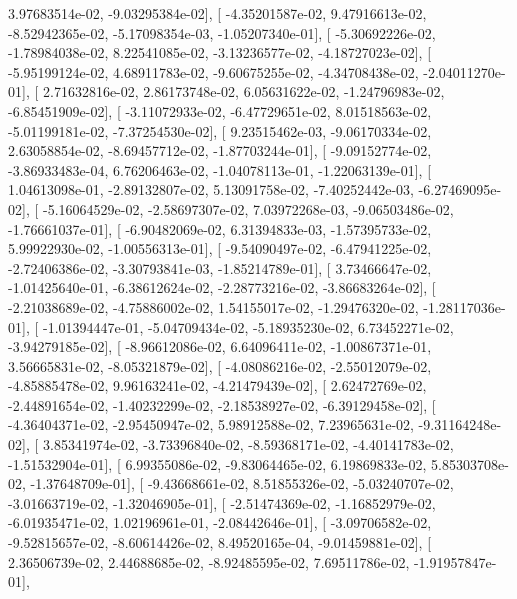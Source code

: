 \documentclass{article}
\begin{document}
          3.97683514e-02,  -9.03295384e-02],
       [ -4.35201587e-02,   9.47916613e-02,  -8.52942365e-02,
         -5.17098354e-03,  -1.05207340e-01],
       [ -5.30692226e-02,  -1.78984038e-02,   8.22541085e-02,
         -3.13236577e-02,  -4.18727023e-02],
       [ -5.95199124e-02,   4.68911783e-02,  -9.60675255e-02,
         -4.34708438e-02,  -2.04011270e-01],
       [  2.71632816e-02,   2.86173748e-02,   6.05631622e-02,
         -1.24796983e-02,  -6.85451909e-02],
       [ -3.11072933e-02,  -6.47729651e-02,   8.01518563e-02,
         -5.01199181e-02,  -7.37254530e-02],
       [  9.23515462e-03,  -9.06170334e-02,   2.63058854e-02,
         -8.69457712e-02,  -1.87703244e-01],
       [ -9.09152774e-02,  -3.86933483e-04,   6.76206463e-02,
         -1.04078113e-01,  -1.22063139e-01],
       [  1.04613098e-01,  -2.89132807e-02,   5.13091758e-02,
         -7.40252442e-03,  -6.27469095e-02],
       [ -5.16064529e-02,  -2.58697307e-02,   7.03972268e-03,
         -9.06503486e-02,  -1.76661037e-01],
       [ -6.90482069e-02,   6.31394833e-03,  -1.57395733e-02,
          5.99922930e-02,  -1.00556313e-01],
       [ -9.54090497e-02,  -6.47941225e-02,  -2.72406386e-02,
         -3.30793841e-03,  -1.85214789e-01],
       [  3.73466647e-02,  -1.01425640e-01,  -6.38612624e-02,
         -2.28773216e-02,  -3.86683264e-02],
       [ -2.21038689e-02,  -4.75886002e-02,   1.54155017e-02,
         -1.29476320e-02,  -1.28117036e-01],
       [ -1.01394447e-01,  -5.04709434e-02,  -5.18935230e-02,
          6.73452271e-02,  -3.94279185e-02],
       [ -8.96612086e-02,   6.64096411e-02,  -1.00867371e-01,
          3.56665831e-02,  -8.05321879e-02],
       [ -4.08086216e-02,  -2.55012079e-02,  -4.85885478e-02,
          9.96163241e-02,  -4.21479439e-02],
       [  2.62472769e-02,  -2.44891654e-02,  -1.40232299e-02,
         -2.18538927e-02,  -6.39129458e-02],
       [ -4.36404371e-02,  -2.95450947e-02,   5.98912588e-02,
          7.23965631e-02,  -9.31164248e-02],
       [  3.85341974e-02,  -3.73396840e-02,  -8.59368171e-02,
         -4.40141783e-02,  -1.51532904e-01],
       [  6.99355086e-02,  -9.83064465e-02,   6.19869833e-02,
          5.85303708e-02,  -1.37648709e-01],
       [ -9.43668661e-02,   8.51855326e-02,  -5.03240707e-02,
         -3.01663719e-02,  -1.32046905e-01],
       [ -2.51474369e-02,  -1.16852979e-02,  -6.01935471e-02,
          1.02196961e-01,  -2.08442646e-01],
       [ -3.09706582e-02,  -9.52815657e-02,  -8.60614426e-02,
          8.49520165e-04,  -9.01459881e-02],
       [  2.36506739e-02,   2.44688685e-02,  -8.92485595e-02,
          7.69511786e-02,  -1.91957847e-01],
\end{document}
